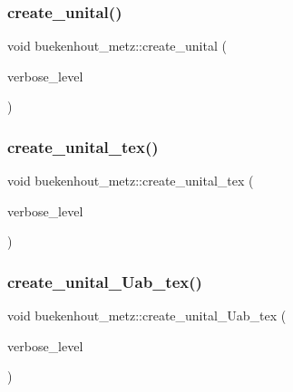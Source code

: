 \subsubsection{\texorpdfstring{create\+\_\+unital()}{create\_unital()}}
{\footnotesize\ttfamily void buekenhout\+\_\+metz\+::create\+\_\+unital (\begin{DoxyParamCaption}\item[{\mbox{\hyperlink{galois_8h_a09fddde158a3a20bd2dcadb609de11dc}{I\+NT}}}]{verbose\+\_\+level }\end{DoxyParamCaption})}

\mbox{\label{classbuekenhout__metz_a6c44e4063100cf3255f2e67326a33934}} 
\subsubsection{\texorpdfstring{create\+\_\+unital\+\_\+tex()}{create\_unital\_tex()}}
{\footnotesize\ttfamily void buekenhout\+\_\+metz\+::create\+\_\+unital\+\_\+tex (\begin{DoxyParamCaption}\item[{\mbox{\hyperlink{galois_8h_a09fddde158a3a20bd2dcadb609de11dc}{I\+NT}}}]{verbose\+\_\+level }\end{DoxyParamCaption})}

\mbox{\label{classbuekenhout__metz_aa293e5c9781709f5bfcd4185481eced5}} 
\subsubsection{\texorpdfstring{create\+\_\+unital\+\_\+\+Uab\+\_\+tex()}{create\_unital\_Uab\_tex()}}
{\footnotesize\ttfamily void buekenhout\+\_\+metz\+::create\+\_\+unital\+\_\+\+Uab\+\_\+tex (\begin{DoxyParamCaption}\item[{\mbox{\hyperlink{galois_8h_a09fddde158a3a20bd2dcadb609de11dc}{I\+NT}}}]{verbose\+\_\+level }\end{DoxyParamCaption})}

